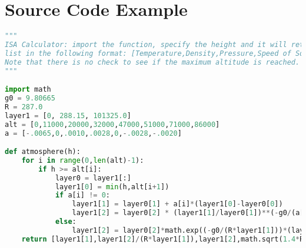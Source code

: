 \chapter{Source Code Example}


\begin{lstlisting}[language=Python]
"""
ISA Calculator: import the function, specify the height and it will return a
list in the following format: [Temperature,Density,Pressure,Speed of Sound].
Note that there is no check to see if the maximum altitude is reached.
"""

import math
g0 = 9.80665
R = 287.0
layer1 = [0, 288.15, 101325.0]
alt = [0,11000,20000,32000,47000,51000,71000,86000]
a = [-.0065,0,.0010,.0028,0,-.0028,-.0020]

def atmosphere(h):
    for i in range(0,len(alt)-1):
        if h >= alt[i]:
            layer0 = layer1[:]
            layer1[0] = min(h,alt[i+1])
            if a[i] != 0:
                layer1[1] = layer0[1] + a[i]*(layer1[0]-layer0[0])
                layer1[2] = layer0[2] * (layer1[1]/layer0[1])**(-g0/(a[i]*R))
            else:
                layer1[2] = layer0[2]*math.exp((-g0/(R*layer1[1]))*(layer1[0]-layer0[0]))
    return [layer1[1],layer1[2]/(R*layer1[1]),layer1[2],math.sqrt(1.4*R*layer1[1])]
\end{lstlisting}
